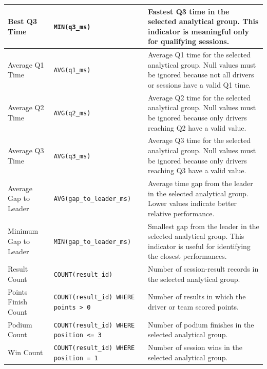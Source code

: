 \documentclass[a4paper,11pt]{article}
\begin{document}
\begin{longtable}{|p{4.5cm}|p{5.2cm}|p{6cm}|}
		Best Q3 Time
		& \texttt{MIN(q3\_ms)}
		& Fastest Q3 time in the selected analytical group. This indicator is meaningful only
		for qualifying sessions. \\
		\hline
		
		Average Q1 Time
		& \texttt{AVG(q1\_ms)}
		& Average Q1 time for the selected analytical group. Null values must be ignored
		because not all drivers or sessions have a valid Q1 time. \\
		\hline
		
		Average Q2 Time
		& \texttt{AVG(q2\_ms)}
		& Average Q2 time for the selected analytical group. Null values must be ignored
		because only drivers reaching Q2 have a valid value. \\
		\hline
		
		Average Q3 Time
		& \texttt{AVG(q3\_ms)}
		& Average Q3 time for the selected analytical group. Null values must be ignored
		because only drivers reaching Q3 have a valid value. \\
		\hline
		
		Average Gap to Leader
		& \texttt{AVG(gap\_to\_leader\_ms)}
		& Average time gap from the leader in the selected analytical group. Lower values
		indicate better relative performance. \\
		\hline
		
		Minimum Gap to Leader
		& \texttt{MIN(gap\_to\_leader\_ms)}
		& Smallest gap from the leader in the selected analytical group. This indicator is
		useful for identifying the closest performances. \\
		\hline
		
		Result Count
		& \texttt{COUNT(result\_id)}
		& Number of session-result records in the selected analytical group. \\
		\hline
		
		Points Finish Count
		& \texttt{COUNT(result\_id) WHERE points > 0}
		& Number of results in which the driver or team scored points. \\
		\hline
		
		Podium Count
		& \texttt{COUNT(result\_id) WHERE position <= 3}
		& Number of podium finishes in the selected analytical group. \\
		\hline
		
		Win Count
		& \texttt{COUNT(result\_id) WHERE position = 1}
		& Number of session wins in the selected analytical group. \\
		\hline
		
	\end{longtable}
	
\end{document}
